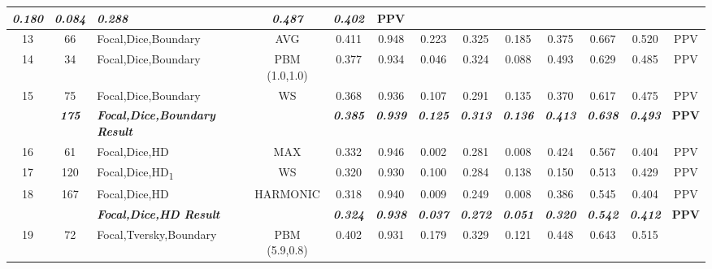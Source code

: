 \begin{table}[H]
{\begin{tabular}{cc|l|c|c|c|c|c|c|c|c|c|c|}
    \textit{\textbf{0.180}} &
    \textit{\textbf{0.084}} &
    \textit{\textbf{0.288}} &
    \textit{\textbf{0.487}} &
    \textit{\textbf{0.402}} &
    \textbf{PPV} \\ \hline
  \multicolumn{1}{|c|}{13} &
    66 &
    Focal,Dice,Boundary &
    AVG &
    0.411 &
    0.948 &
    0.223 &
    0.325 &
    0.185 &
    0.375 &
    0.667 &
    0.520 &
    PPV \\ \hline
  \multicolumn{1}{|c|}{14} &
    34 &
    Focal,Dice,Boundary &
    PBM (1.0,1.0) &
    0.377 &
    0.934 &
    0.046 &
    0.324 &
    0.088 &
    0.493 &
    0.629 &
    0.485 &
    PPV \\ \hline
  \multicolumn{1}{|c|}{15} &
    75 &
    Focal,Dice,Boundary &
    WS &
    0.368 &
    0.936 &
    0.107 &
    0.291 &
    0.135 &
    0.370 &
    0.617 &
    0.475 &
    PPV \\ \hline
  \textbf{} &
    \textit{\textbf{175}} &
    \textit{\textbf{Focal,Dice,Boundary Result}} &
    \textbf{} &
    \textit{\textbf{0.385}} &
    \textit{\textbf{0.939}} &
    \textit{\textbf{0.125}} &
    \textit{\textbf{0.313}} &
    \textit{\textbf{0.136}} &
    \textit{\textbf{0.413}} &
    \textit{\textbf{0.638}} &
    \textit{\textbf{0.493}} &
    \textbf{PPV} \\ \hline
  \multicolumn{1}{|c|}{16} &
    61 &
    Focal,Dice,HD &
    MAX &
    0.332 &
    0.946 &
    0.002 &
    0.281 &
    0.008 &
    0.424 &
    0.567 &
    0.404 &
    PPV \\ \hline
  \multicolumn{1}{|c|}{17} &
    120 &
    Focal,Dice,HD\textsubscript{1} &
    WS &
    0.320 &
    0.930 &
    0.100 &
    0.284 &
    0.138 &
    0.150 &
    0.513 &
    0.429 &
    PPV \\ \hline
  \multicolumn{1}{|c|}{18} &
    167 &
    Focal,Dice,HD &
    HARMONIC &
    0.318 &
    0.940 &
    0.009 &
    0.249 &
    0.008 &
    0.386 &
    0.545 &
    0.404 &
    PPV \\ \hline
  \textbf{} &
    \textit{\textbf{}} &
    \textit{\textbf{Focal,Dice,HD Result}} &
    \textbf{} &
    \textit{\textbf{0.324}} &
    \textit{\textbf{0.938}} &
    \textit{\textbf{0.037}} &
    \textit{\textbf{0.272}} &
    \textit{\textbf{0.051}} &
    \textit{\textbf{0.320}} &
    \textit{\textbf{0.542}} &
    \textit{\textbf{0.412}} &
    \textbf{PPV} \\ \hline
  \multicolumn{1}{|c|}{19} &
    72 &
    Focal,Tversky,Boundary &
    PBM (5.9,0.8) &
    0.402 &
    0.931 &
    0.179 &
    0.329 &
    0.121 &
    0.448 &
    0.643 &
    0.515 &

\end{tabular}}
\end{table}
